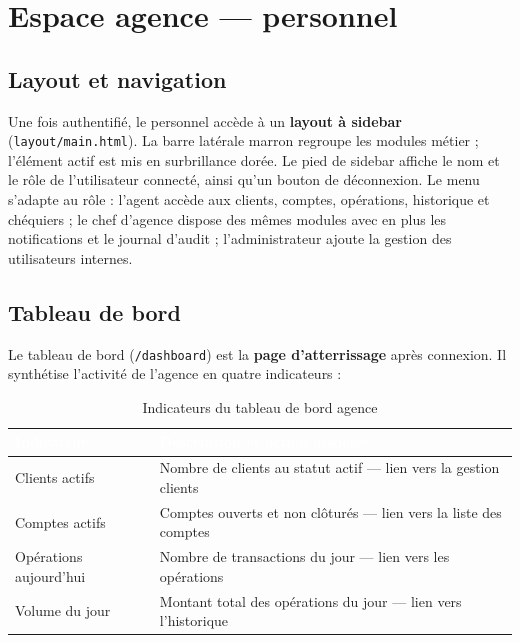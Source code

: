 \documentclass[11pt,a4paper,oneside]{report}
\newcommand{\tabhead}[1]{\textcolor{white}{\textbf{#1}}}
\begin{document}

\section{Espace agence — personnel}

\subsection{Layout et navigation}

Une fois authentifié, le personnel accède à un \textbf{layout à sidebar} (\texttt{layout/main.html}). La barre latérale marron regroupe les modules métier ; l'élément actif est mis en surbrillance dorée. Le pied de sidebar affiche le nom et le rôle de l'utilisateur connecté, ainsi qu'un bouton de déconnexion. Le menu s'adapte au rôle : l'agent accède aux clients, comptes, opérations, historique et chéquiers ; le chef d'agence dispose des mêmes modules avec en plus les notifications et le journal d'audit ; l'administrateur ajoute la gestion des utilisateurs internes.

\subsection{Tableau de bord}

Le tableau de bord (\texttt{/dashboard}) est la \textbf{page d'atterrissage} après connexion. Il synthétise l'activité de l'agence en quatre indicateurs :

\begin{table}[H]
    \centering
    \caption{Indicateurs du tableau de bord agence}
    \label{tab:kpi-agence}
    \small
    \begin{tabular}{@{}lp{8cm}@{}}
        \rowcolor{AmanaBrown}
        \tabhead{Indicateur} & \tabhead{Description et action associée} \\
        \midrule
        Clients actifs & Nombre de clients au statut actif — lien vers la gestion clients \\
        Comptes actifs & Comptes ouverts et non clôturés — lien vers la liste des comptes \\
        Opérations aujourd'hui & Nombre de transactions du jour — lien vers les opérations \\
        Volume du jour & Montant total des opérations du jour — lien vers l'historique \\
        \bottomrule
    \end{tabular}
\end{table}
\end{document}
